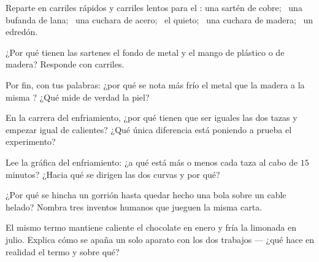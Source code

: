 \begin{exercise}[$\star$]\label{exo:g5:heat-and-insulation:3}
Reparte en carriles rápidos y carriles lentos para el : una
sartén de cobre; \ una bufanda de lana; \ una cuchara de acero; \ el
 quieto; \ una cuchara de madera; \ un edredón.
\end{exercise}

\begin{exercise}[$\star$]\label{exo:g5:heat-and-insulation:4}
¿Por qué tienen las sartenes el fondo de metal y el mango de plástico
o de madera? Responde con carriles.
\end{exercise}

\begin{exercise}[$\star$]\label{exo:g5:heat-and-insulation:5}
Por fin, con tus palabras: ¿por qué se nota más frío el metal que la
madera a la misma ? ¿Qué mide de verdad la piel?
\end{exercise}

\begin{exercise}[$\star$]\label{exo:g5:heat-and-insulation:6}
En la carrera del enfriamiento, ¿por qué tienen que ser iguales las
dos tazas y empezar igual de calientes? ¿Qué única diferencia está
poniendo a prueba el experimento?
\end{exercise}

\begin{exercise}[$\star$]\label{exo:g5:heat-and-insulation:7}
Lee la gráfica del enfriamiento: ¿a qué  está más o
menos cada taza al cabo de $15$ minutos? ¿Hacia qué  se
dirigen las dos curvas y por qué?
\end{exercise}

\begin{exercise}[$\star$]\label{exo:g5:heat-and-insulation:8}
¿Por qué se hincha un gorrión hasta quedar hecho una bola sobre un
cable helado? Nombra tres inventos humanos que jueguen la misma carta.
\end{exercise}

\begin{exercise}[$\star\star$]\label{exo:g5:heat-and-insulation:9}
El mismo termo mantiene caliente el chocolate en enero y fría la
limonada en julio. Explica cómo se apaña un solo aparato con los dos
trabajos --- ¿qué hace en realidad el termo y sobre qué?
\end{exercise}

